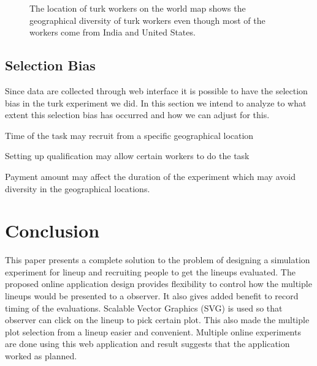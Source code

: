 \documentclass[11pt]{article}
\begin{document}
\begin{figure}[hbtp]
   \centering
       \caption{The location of turk workers on the world map shows the geographical diversity of turk workers even though most of the workers come from India and United States.}
       \label{fig:rsq}
\end{figure}

\subsection{Selection Bias} Since data are collected through web interface it is possible to have the selection bias in the turk experiment we did. In this section we intend to analyze to what extent this selection bias has occurred and how we can adjust for this.


Time of the task may recruit from a specific geographical location

Setting up qualification may allow certain workers to do the task

Payment amount may affect the duration of the experiment which may avoid diversity in the geographical locations.


\section{Conclusion} This paper presents a complete solution to the problem of designing a simulation experiment for lineup and recruiting people to get the lineups evaluated. The proposed online application design provides flexibility to control how the multiple lineups would be presented to a observer. It also gives added benefit to record timing of the evaluations. Scalable Vector Graphics (SVG) is used so that observer can click on the lineup to pick certain plot. This also made the multiple plot selection from a lineup easier and convenient. Multiple online experiments are done using this web application and result suggests that the application worked as planned.
\end{document}
